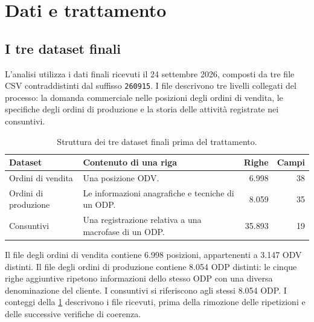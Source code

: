 \section{Dati e trattamento}
\label{sec:data-and-treatment}

\subsection{I tre dataset finali}
\label{sec:updated-datasets}

L'analisi utilizza i dati finali ricevuti il 24 settembre 2026, composti da tre file CSV contraddistinti dal suffisso \texttt{260915}. I file descrivono tre livelli collegati del processo: la domanda commerciale nelle posizioni degli ordini di vendita, le specifiche degli ordini di produzione e la storia delle attività registrate nei consuntivi.

\begin{table}[htbp]
\centering
\begin{tabularx}{\linewidth}{@{}lXrr@{}}
\toprule
\textbf{Dataset} & \textbf{Contenuto di una riga} & \textbf{Righe} & \textbf{Campi} \\
\midrule
Ordini di vendita & Una posizione ODV. & 6.998 & 38 \\
Ordini di produzione & Le informazioni anagrafiche e tecniche di un ODP. & 8.059 & 35 \\
Consuntivi & Una registrazione relativa a una macrofase di un ODP. & 35.893 & 19 \\
\bottomrule
\end{tabularx}
\caption{Struttura dei tre dataset finali prima del trattamento.}
\label{tab:updated-datasets}
\end{table}

Il file degli ordini di vendita contiene 6.998 posizioni, appartenenti a 3.147 ODV distinti. Il file degli ordini di produzione contiene 8.054 ODP distinti: le cinque righe aggiuntive ripetono informazioni dello stesso ODP con una diversa denominazione del cliente. I consuntivi si riferiscono agli stessi 8.054 ODP. I conteggi della \cref{tab:updated-datasets} descrivono i file ricevuti, prima della rimozione delle ripetizioni e delle successive verifiche di coerenza.

